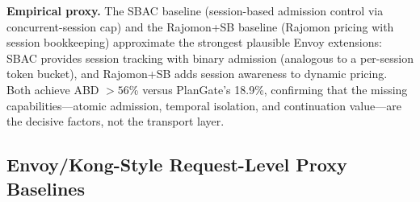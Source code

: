 \documentclass[sigconf,anonymous]{acmart}
\begin{document}
\begin{table}[h]
\caption{Session commitment requirements vs.\ native API gateway capabilities. \,=\,not natively supported; $\sim$\,=\,partially expressible with extensions; $\bigstar$\,=\,requires a custom stateful governance extension.}
\label{tab:envoy_gap}
\small
{}
\end{table}

\textbf{Empirical proxy.}
The SBAC baseline (session-based admission control via concurrent-session cap) and the Rajomon+SB baseline (Rajomon pricing with session bookkeeping) approximate the strongest plausible Envoy extensions: SBAC provides session tracking with binary admission (analogous to a per-session token bucket), and Rajomon+SB adds session awareness to dynamic pricing. Both achieve ABD $>56$\% versus PlanGate's 18.9\%, confirming that the missing capabilities---atomic admission, temporal isolation, and continuation value---are the decisive factors, not the transport layer.

\subsection{Envoy/Kong-Style Request-Level Proxy Baselines}
\label{sec:proxy_baselines}
\end{document}
